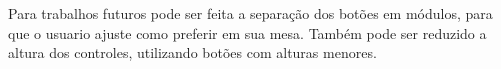 \documentclass[
	12pt,			%
	openright,		%
	oneside,			%
	a4paper,			%
	chapter=TITLE,		%
	english,			%
	brazil,			%
	]{abntex2}
\begin{document}
Para trabalhos futuros pode ser feita a separação dos botões em módulos, para que o usuario ajuste como preferir em sua mesa. Também pode ser reduzido a altura dos controles, utilizando botões com alturas menores.

\nocite{unojoy}
\nocite{uniriotec}
\nocite{governobr}
\nocite{ifprcuritiba}
\nocite{joytokey}
\nocite{antimicro}
\nocite{arduinothomsen}
\nocite{arduinocomprarthomsen}
\nocite{xpadder}
\nocite{ifba}
\nocite{civiam}
\nocite{civiamRoller}
\nocite{tix}
\nocite{iso9241}
\nocite{sdhpr}
\nocite{saude}
\nocite{w3c}
\nocite{lei10098}
\nocite{anexoa}


%






\postextual


%





%
%

%
%
%
%
%
%
%
%
\end{document}
